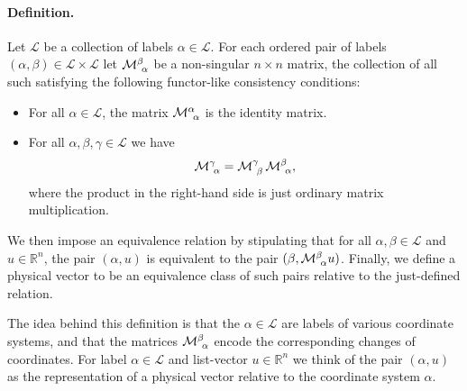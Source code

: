 \documentclass[12pt]{article}
\newcommand{\vu}{u}
\newcommand{\cL}{\mathcal{L}}
\newcommand{\tmat}{\mathcal{M}}
\newcommand{\du}[2]{^{#2}_{\hphantom{#2}\!#1}}
\newcommand{\reals}{\mathbb{R}}
\begin{document}
\paragraph{Definition.}
Let $\cL$ be a collection of labels $\alpha\in\cL$. For each ordered
pair of labels $(\alpha,\beta)\in\cL\times\cL$ let
$\tmat\du{\alpha}{\beta}$ be a non-singular $n\times n$ matrix, the
collection of all such satisfying the following functor-like
consistency conditions:
\begin{itemize}
\item For all $\alpha\in \cL$, the matrix $\tmat\du{\alpha}{\alpha}$ is
  the identity matrix.
\item For all $\alpha,\beta,\gamma \in \cL$ we have
  $$\tmat\du{\alpha}{\gamma} = \tmat\du{\beta}{\gamma}\, \tmat\du{\alpha}{\beta},$$
  where the product in
  the right-hand side is just ordinary matrix multiplication. 
\end{itemize}
We then impose an equivalence relation by stipulating that for all
$\alpha,\beta\in\cL$ and $\vu\in\reals^n$, the pair $(\alpha,\vu)$ is
equivalent to the pair $(\beta,\tmat\du{\alpha}{\beta}\vu)$.  Finally,
we define a physical vector to be an equivalence class of such pairs
relative to the just-defined relation.

The idea behind this definition is that the $\alpha\in \cL$ are labels
of various coordinate systems, and that the matrices
$\tmat\du{\alpha}{\beta}$ encode the corresponding changes of
coordinates. For label $\alpha\in \cL$ and list-vector
$\vu\in\reals^n$ we think of the pair $(\alpha,\vu)$ as the
representation of a physical vector relative to the coordinate system
$\alpha$.
\end{document}
